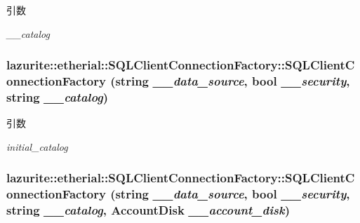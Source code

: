 \begin{DoxyParams}{引数}
\item[{\em \_\-\_\-catalog}]\end{DoxyParams}
\hypertarget{classlazurite_1_1etherial_1_1_s_q_l_client_connection_factory_af3ae72c1c3e7901831826f827c2c1970}{
\subsubsection[{SQLClientConnectionFactory}]{\setlength{\rightskip}{0pt plus 5cm}lazurite::etherial::SQLClientConnectionFactory::SQLClientConnectionFactory (string {\em \_\-\_\-data\_\-source}, \/  bool {\em \_\-\_\-security}, \/  string {\em \_\-\_\-catalog})}}
\label{classlazurite_1_1etherial_1_1_s_q_l_client_connection_factory_af3ae72c1c3e7901831826f827c2c1970}

\begin{DoxyParams}{引数}
\item[{\em initial\_\-catalog}]\end{DoxyParams}
\hypertarget{classlazurite_1_1etherial_1_1_s_q_l_client_connection_factory_af56744726136c9826b74bef8c8da632a}{
\subsubsection[{SQLClientConnectionFactory}]{\setlength{\rightskip}{0pt plus 5cm}lazurite::etherial::SQLClientConnectionFactory::SQLClientConnectionFactory (string {\em \_\-\_\-data\_\-source}, \/  bool {\em \_\-\_\-security}, \/  string {\em \_\-\_\-catalog}, \/  {\bf AccountDisk} {\em \_\-\_\-account\_\-disk})}}
\label{classlazurite_1_1etherial_1_1_s_q_l_client_connection_factory_af56744726136c9826b74bef8c8da632a}

